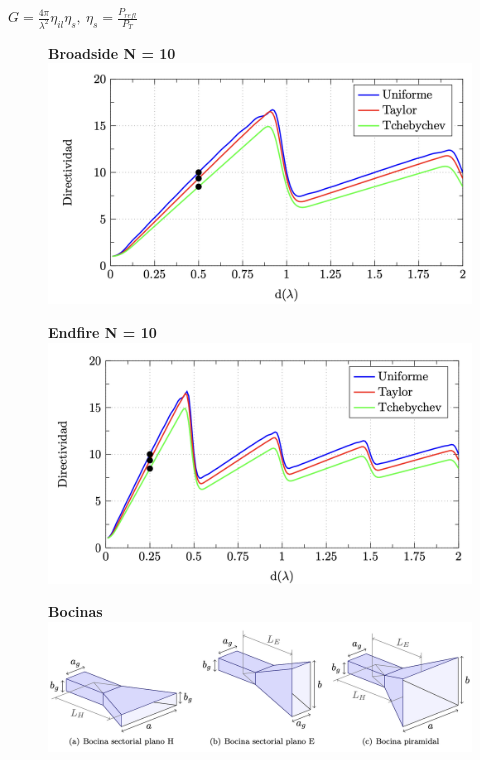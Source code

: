 \documentclass[twocolumn, 8pt]{extarticle}
\begin{document}
\vspace{0.5cm}
\( G = \frac{4\pi}{\lambda^2} \eta_{il} \eta_{s},\ \eta_{s} = \frac{P_{refl}}{P_T} \)

\newpage

\begin{multicols}{2}
	\begin{figure}[H]
		\centering
		\textbf{Broadside N = 10}
		\includegraphics[width=\columnwidth]{directividad_broadside.png}
	\end{figure}

	\begin{figure}[H]
		\centering
		\textbf{Endfire N = 10}
		\includegraphics[width=\columnwidth]{directividad_endfire.png}
	\end{figure}
\end{multicols}

\begin{figure}[H]
	\centering
	\textbf{Bocinas}
	\centering
	\includegraphics[width=\columnwidth]{bocinas.png}
\end{figure}
\end{document}
